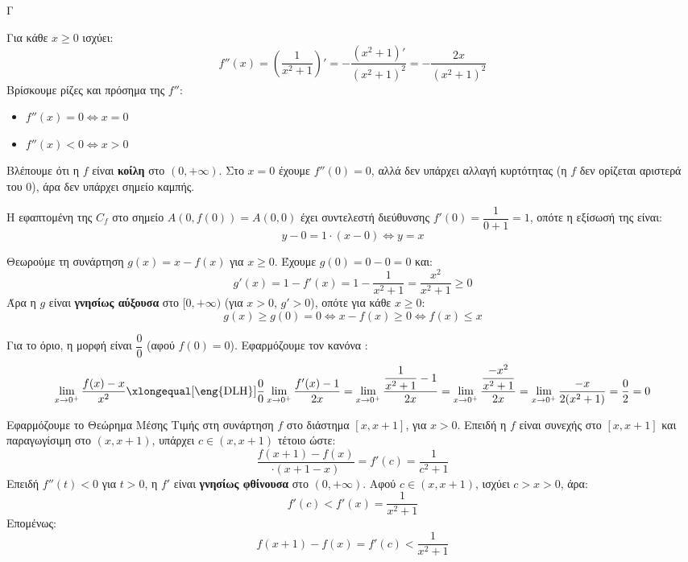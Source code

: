 \begin{thema}{Γ}
\begin{erwthma}
\item Για κάθε $x\geq 0$ ισχύει:
\[f''(x)=\left(\frac{1}{x^2+1}\right)'=-\dfrac{(x^2+1)'}{(x^2+1)^2}=-\frac{2x}{(x^2+1)^2}\]
Βρίσκουμε ρίζες και πρόσημα της $f''$:
\begin{itemize}
\item $f''(x)=0\Leftrightarrow x=0$
\item $f''(x)<0\Leftrightarrow x>0$
\end{itemize}
\begin{center}
\end{center}
Βλέπουμε ότι η $f$ είναι \textbf{κοίλη} στο $(0,+\infty)$. Στο $x=0$ έχουμε $f''(0)=0$, αλλά δεν υπάρχει αλλαγή κυρτότητας (η $f$ δεν ορίζεται αριστερά του $0$), άρα δεν υπάρχει σημείο καμπής.

Η εφαπτομένη της $C_f$ στο σημείο $A(0,f(0))=A(0,0)$ έχει συντελεστή διεύθυνσης $f'(0)=\dfrac{1}{0+1}=1$, οπότε η εξίσωσή της είναι:
\[y-0=1\cdot(x-0)\Leftrightarrow y=x\]

\item Θεωρούμε τη συνάρτηση $g(x)=x-f(x)$ για $x\geq 0$. Έχουμε $g(0)=0-0=0$ και:
\[g'(x)=1-f'(x)=1-\frac{1}{x^2+1}=\frac{x^2}{x^2+1}\geq 0\]
Άρα η $g$ είναι \textbf{γνησίως αύξουσα} στο $[0,+\infty)$ (για $x>0$, $g'>0$), οπότε για κάθε $x\geq 0$:
\[g(x)\geq g(0)=0\Leftrightarrow x-f(x)\geq 0\Leftrightarrow f(x)\leq x\]

Για το όριο, η μορφή είναι $\dfrac{0}{0}$ (αφού $f(0)=0$). Εφαρμόζουμε τον κανόνα :
\[
\lim_{x\to 0^+}\frac{f(x)-x}{x^2}
\xlongequal[\text{\eng{DLH}}]{\frac{0}{0}}
\lim_{x\to 0^+}\frac{f'(x)-1}{2x}
=\lim_{x\to 0^+}\frac{\dfrac{1}{x^2+1}-1}{2x}
=\lim_{x\to 0^+}\frac{\dfrac{-x^2}{x^2+1}}{2x}
=\lim_{x\to 0^+}\frac{-x}{2(x^2+1)}=\frac{0}{2}=0
\]

\item Εφαρμόζουμε το Θεώρημα Μέσης Τιμής στη συνάρτηση $f$ στο διάστημα $[x,x+1]$, για $x>0$. Επειδή η $f$ είναι συνεχής στο $[x,x+1]$ και παραγωγίσιμη στο $(x,x+1)$, υπάρχει $c\in(x,x+1)$ τέτοιο ώστε:
\[\frac{f(x+1)-f(x)}{\cdot(x+1-x)}=f'(c)=\frac{1}{c^2+1}\]
Επειδή $f''(t)<0$ για $t>0$, η $f'$ είναι \textbf{γνησίως φθίνουσα} στο $(0,+\infty)$. Αφού $c\in(x,x+1)$, ισχύει $c>x>0$, άρα:
\[f'(c)<f'(x)=\frac{1}{x^2+1}\]
Επομένως:
\[f(x+1)-f(x)=f'(c)<\frac{1}{x^2+1}\]


\end{erwthma}
\end{thema}
